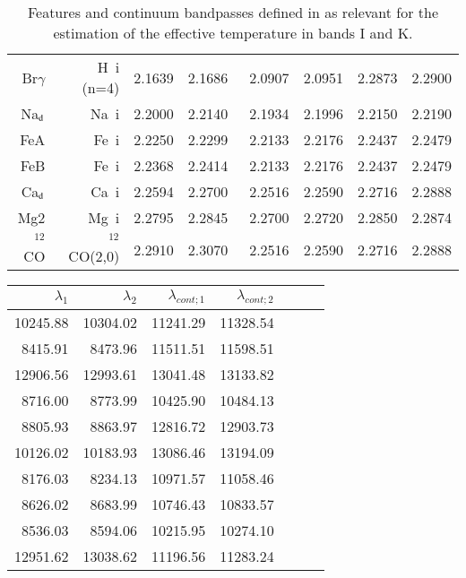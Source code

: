 \begin{appendix}
\begin{table*}
\begin{center}
\begin{tabular}{rrrrrrrr}
Br$\gamma$  & H{~\sc i} (n=4)& 2.1639 & 2.1686~& 2.0907 & 2.0951 & 2.2873 & 2.2900 \\
Na$_{\rm d}$& Na{~\sc i}     & 2.2000 & 2.2140~& 2.1934 & 2.1996  & 2.2150 & 2.2190   \\
FeA         & Fe{~\sc i}     & 2.2250 & 2.2299~& 2.2133 & 2.2176 & 2.2437 & 2.2479 \\
FeB         & Fe{~\sc i}     & 2.2368 & 2.2414~& 2.2133 & 2.2176 & 2.2437 & 2.2479 \\
Ca$_{\rm d}$& Ca{~\sc i}     & 2.2594 & 2.2700~& 2.2516 & 2.2590  & 2.2716 & 2.2888   \\
Mg2         & Mg{~\sc i}     & 2.2795 & 2.2845~& 2.2700 & 2.2720 & 2.2850 & 2.2874 \\
$^{12}$CO   & $^{12}$CO(2,0) & 2.2910 & 2.3070~& 2.2516 & 2.2590   & 2.2716 & 2.2888   \\
\hline
\end{tabular}
\caption {Features and continuum bandpasses defined in 
   \cite{cesetti} as relevant for the estimation of the
   effective temperature in bands I and K.} \label{tab:irtf-cesetti}
\end{center}
\end{table*}


%
% 
\begin{table}
\begin{center}
\begin{tabular}{rrrrrrr}
  \hline
  $\lambda_1$ & $\lambda_2$ & $\lambda_{cont;1}$ & $\lambda_{cont;2} $ \\ 
  \hline
     10245.88 & 10304.02 &	11241.29 & 11328.54 \\
     8415.91  & 8473.96  &	11511.51 & 11598.51\\
     12906.56 & 12993.61 &	13041.48 & 13133.82\\
     8716.00  & 8773.99  &	10425.90 & 10484.13\\
     8805.93  & 8863.97  &	12816.72 & 12903.73\\
     10126.02 & 10183.93 &	13086.46 & 13194.09\\
     8176.03  & 8234.13  &	10971.57 & 11058.46\\
     8626.02  & 8683.99  &	10746.43 & 10833.57\\
     8536.03  & 8594.06  &	10215.95 & 10274.10\\
     12951.62 & 13038.62 &	11196.56 & 11283.24 \\


\end{tabular}
\end{center}
\end{table}
\end{appendix}
